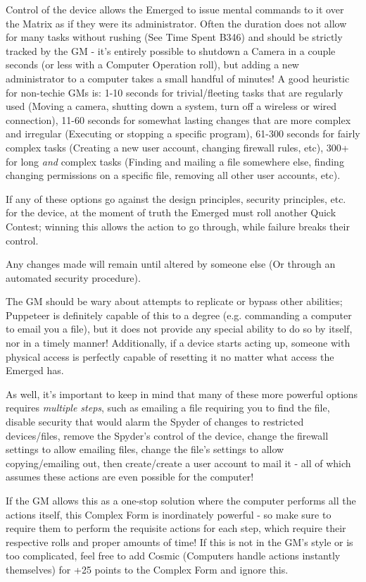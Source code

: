 \begin{multicols*}{3}
	Control of the device allows the Emerged to issue mental commands to it over the Matrix as if they were its administrator. Often the duration does not allow for many tasks without rushing (See Time Spent B346) and should be strictly tracked by the GM - it's entirely possible to shutdown a Camera in a couple seconds (or less with a Computer Operation roll), but adding a new administrator to a computer takes a small handful of minutes! A good heuristic for non-techie GMs is: 1-10 seconds for trivial/fleeting tasks that are regularly used (Moving a camera, shutting down a system, turn off a wireless or wired connection), 11-60 seconds for somewhat lasting changes that are more complex and irregular (Executing or stopping a specific program), 61-300 seconds for fairly complex tasks (Creating a new user account, changing firewall rules, etc), 300+ for long \textit{and} complex tasks (Finding and mailing a file somewhere else, finding changing permissions on a specific file, removing all other user accounts, etc).
	
	If any of these options go against the design principles, security principles, etc. for the device, at the moment of truth the Emerged must roll another Quick Contest; winning this allows the action to go through, while failure breaks their control.
	
	Any changes made will remain until altered by someone else (Or through an automated security procedure).
	
	The GM should be wary about attempts to replicate or bypass other abilities; Puppeteer is definitely capable of this to a degree (e.g. commanding a computer to email you a file), but it does not provide any special ability to do so by itself, nor in a timely manner! Additionally, if a device starts acting up, someone with physical access is perfectly capable of resetting it no matter what access the Emerged has. 
	
	As well, it's important to keep in mind that many of these more powerful options requires \textit{multiple steps}, such as emailing a file requiring you to find the file, disable security that would alarm the Spyder of changes to restricted devices/files, remove the Spyder's control of the device,  change the firewall settings to allow emailing files, change the file's settings to allow copying/emailing out, then create/create a user account to mail it - all of which assumes these actions are even possible for the computer! 
	
	If the GM allows this as a one-stop solution where the computer performs all the actions itself, this Complex Form is inordinately powerful - so make sure to require them to perform the requisite actions for each step, which require their respective rolls and proper amounts of time! If this is not in the GM's style or is too complicated, feel free to add Cosmic (Computers handle actions instantly themselves) for +25 points to the Complex Form and ignore this.
	

\end{multicols*}
